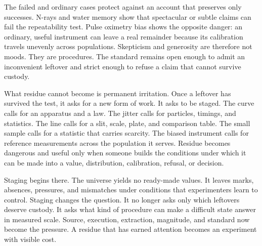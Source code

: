 \begin{movementclose}
The failed and ordinary cases protect against an account that preserves only
successes. N-rays and water memory show that spectacular or subtle claims
can fail the repeatability test. Pulse oximetry bias shows the opposite
danger: an ordinary, useful instrument can leave a real remainder because
its calibration travels unevenly across populations. Skepticism and
generosity are therefore not moods. They are procedures. The standard
remains open enough to admit an inconvenient leftover and strict enough to
refuse a claim that cannot survive custody.

What residue cannot become is permanent irritation. Once a leftover has
survived the test, it asks for a new form of work. It asks to be staged.
The curve calls for an apparatus and a law. The jitter calls for particles,
timings, and statistics. The line calls for a slit, scale, plate, and
comparison table. The small sample calls for a statistic that carries
scarcity. The biased instrument calls for reference measurements across the
population it serves. Residue becomes dangerous and useful only when
someone builds the conditions under which it can be made into a value,
distribution, calibration, refusal, or decision.

Staging begins there. The universe yields no ready-made values. It leaves
marks, absences, pressures, and mismatches under conditions that
experimenters learn to control. Staging changes the question. It no longer
asks only which leftovers deserve custody. It asks what kind of procedure
can make a difficult state answer in measured scale. Source, execution,
extraction, magnitude, and standard now become the pressure. A residue that
has earned attention becomes an experiment with visible cost.
\end{movementclose}
